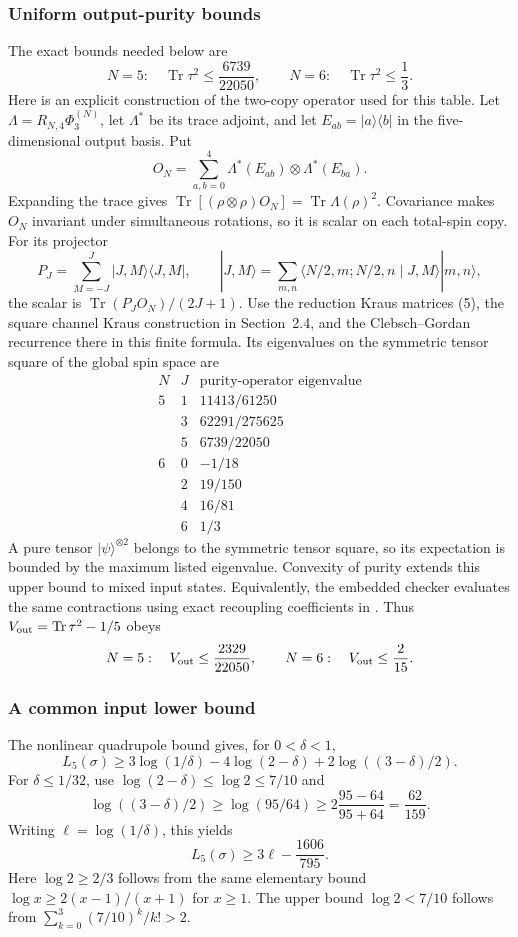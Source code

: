 \documentclass[11pt,a4paper]{article}
\newcommand{\Tr}{\operatorname{Tr}}
\begin{document}
\subsubsection{Uniform output-purity bounds}
The exact bounds needed below are
\[
N=5:\quad\Tr\tau^2\le\frac{6739}{22050},\qquad
N=6:\quad\Tr\tau^2\le\frac13.
\]
Here is an explicit construction of the two-copy operator used for this
table. Let $\Lambda=R_{N,4}\Phi_3^{(N)}$, let $\Lambda^*$ be its trace
adjoint, and let $E_{ab}=|a\rangle\langle b|$ in the five-dimensional
output basis. Put
\[
 O_N=\sum_{a,b=0}^4\Lambda^*(E_{ab})\otimes\Lambda^*(E_{ba}).
\]
Expanding the trace gives
$\operatorname{Tr}[(\rho\otimes\rho)O_N]=\operatorname{Tr}\Lambda(\rho)^2$.
Covariance makes $O_N$ invariant under simultaneous rotations, so it is
scalar on each total-spin copy. For its projector
\[
 P_J=\sum_{M=-J}^J|J,M\rangle\langle J,M|,\qquad
 |J,M\rangle=\sum_{m,n}\langle N/2,m;N/2,n\mid J,M\rangle|m,n\rangle,
\]
the scalar is $\operatorname{Tr}(P_JO_N)/(2J+1)$. Use the reduction
Kraus matrices (5), the square channel Kraus construction in Section~2.4,
and the Clebsch--Gordan recurrence there in this finite formula. Its eigenvalues
on the symmetric tensor square of the global spin space are
\[
\begin{array}{c|c|c}
N&J&\text{purity-operator eigenvalue}\\\hline
5&1&11413/61250\\
 &3&62291/275625\\
 &5&6739/22050\\\hline
6&0&-1/18\\
 &2&19/150\\
 &4&16/81\\
 &6&1/3
\end{array}
\]
A pure tensor $|\psi\rangle^{\otimes2}$ belongs to the symmetric tensor
square, so its expectation is bounded by the maximum listed eigenvalue.
Convexity of purity extends this upper bound to mixed input states.
Equivalently, the embedded checker evaluates the same contractions
using exact recoupling coefficients in
.
Thus $V_{\rm out}=\Tr\tau^2-1/5$ obeys
\[
N=5:\quad V_{\rm out}\le\frac{2329}{22050},\qquad
N=6:\quad V_{\rm out}\le\frac2{15}.
\]

\subsubsection{A common input lower bound}
The nonlinear quadrupole bound gives, for $0<\delta<1$,
\[
L_5(\sigma)\ge3\log(1/\delta)-4\log(2-\delta)
 +2\log((3-\delta)/2).
\]
For $\delta\le1/32$, use
$\log(2-\delta)\le\log2\le7/10$ and
\[
\log((3-\delta)/2)\ge\log(95/64)
\ge2\frac{95-64}{95+64}=\frac{62}{159}.
\]
Writing $\ell=\log(1/\delta)$, this yields
\[
L_5(\sigma)\ge3\ell-\frac{1606}{795}.
\]
Here $\log2\ge2/3$ follows from the same elementary bound
$\log x\ge2(x-1)/(x+1)$ for $x\ge1$.
The upper bound $\log2<7/10$ follows from
$\sum_{k=0}^3(7/10)^k/k!>2$.
\end{document}
